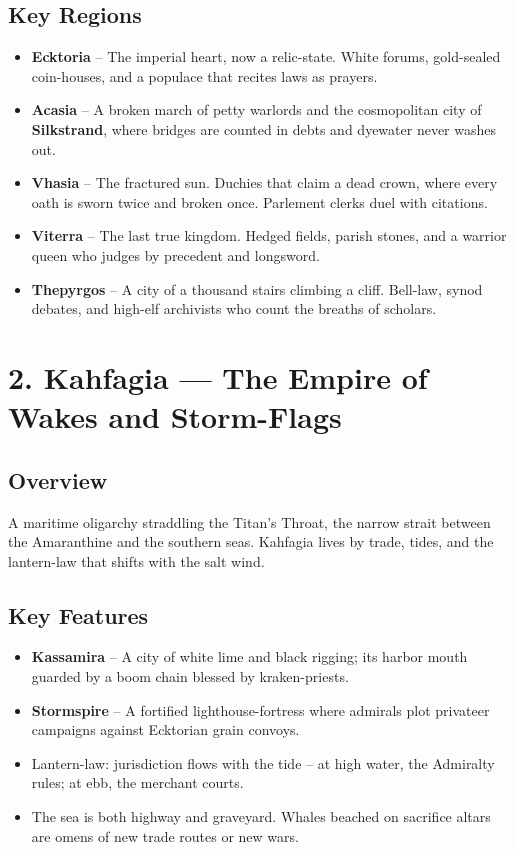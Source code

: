 \documentclass[11pt]{article}
\begin{document}
\subsection*{Key Regions}
\begin{itemize}[leftmargin=*]
    \item \textbf{Ecktoria} -- The imperial heart, now a relic-state. White forums, gold-sealed coin-houses, and a populace that recites laws as prayers.
    \item \textbf{Acasia} -- A broken march of petty warlords and the cosmopolitan city of \textbf{Silkstrand}, where bridges are counted in debts and dyewater never washes out.
    \item \textbf{Vhasia} -- The fractured sun. Duchies that claim a dead crown, where every oath is sworn twice and broken once. Parlement clerks duel with citations.
    \item \textbf{Viterra} -- The last true kingdom. Hedged fields, parish stones, and a warrior queen who judges by precedent and longsword.
    \item \textbf{Thepyrgos} -- A city of a thousand stairs climbing a cliff. Bell-law, synod debates, and high-elf archivists who count the breaths of scholars.
\end{itemize}

\section*{2. Kahfagia --- The Empire of Wakes and Storm-Flags}

\subsection*{Overview}
A maritime oligarchy straddling the Titan's Throat, the narrow strait between the Amaranthine and the southern seas. Kahfagia lives by trade, tides, and the lantern-law that shifts with the salt wind.

\subsection*{Key Features}
\begin{itemize}[leftmargin=*]
    \item \textbf{Kassamira} -- A city of white lime and black rigging; its harbor mouth guarded by a boom chain blessed by kraken-priests.
    \item \textbf{Stormspire} -- A fortified lighthouse-fortress where admirals plot privateer campaigns against Ecktorian grain convoys.
    \item Lantern-law: jurisdiction flows with the tide -- at high water, the Admiralty rules; at ebb, the merchant courts.
    \item The sea is both highway and graveyard. Whales beached on sacrifice altars are omens of new trade routes or new wars.
\end{itemize}
\end{document}
